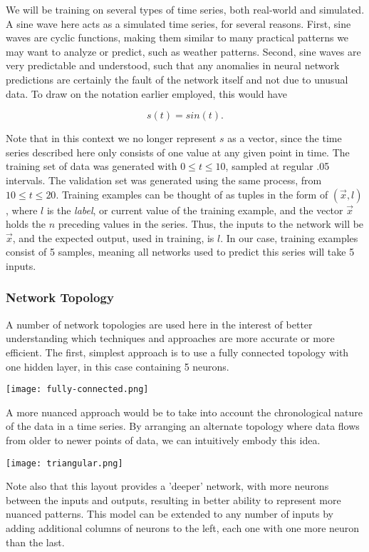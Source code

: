 \documentclass[a4paper, 11pt]{article} %
\begin{document}
We will be training on several types of time series, both real-world and simulated.  A sine wave here acts as a simulated time series, for several reasons.  First, sine waves are cyclic functions, making them similar to many practical patterns we may want to analyze or predict, such as weather patterns.  Second, sine waves are very predictable and understood, such that any anomalies in neural network predictions are certainly the fault of the network itself and not due to unusual data.  To draw on the notation earlier employed, this would have
	
\begin{equation}
s(t) = sin(t).
\end{equation}	
	
Note that in this context we no longer represent $s$ as a vector, since the time series described here only consists of one value at any given point in time.  The training set of data was generated with $0 \leq t \leq 10$, sampled at regular .05 intervals.  The validation set was generated using the same process, from $10 \leq t \leq 20$.  Training examples can be thought of as tuples in the form of $(\vec{x}, l)$, where $l$ is the \textit{label}, or current value of the training example, and the vector $\vec{x}$ holds the $n$ preceding values in the series.  Thus, the inputs to the network will be $\vec{x}$, and the expected output, used in training, is $l$.  In our case, training examples consist of 5 samples, meaning all networks used to predict this series will take 5 inputs.

\subsubsection*{Network Topology}

A number of network topologies are used here in the interest of better understanding which techniques and approaches are more accurate or more efficient.  The first, simplest approach is to use a fully connected topology with one hidden layer, in this case containing 5 neurons.

\texttt{[image: fully-connected.png]}

A more nuanced approach would be to take into account the chronological nature of the data in a time series.  By arranging an alternate topology where data flows from older to newer points of data, we can intuitively embody this idea.

\texttt{[image: triangular.png]}

Note also that this layout provides a 'deeper' network, with more neurons between the inputs and outputs, resulting in better ability to represent more nuanced patterns.  This model can be extended to any number of inputs by adding additional columns of neurons to the left, each one with one more neuron than the last.
\end{document}
